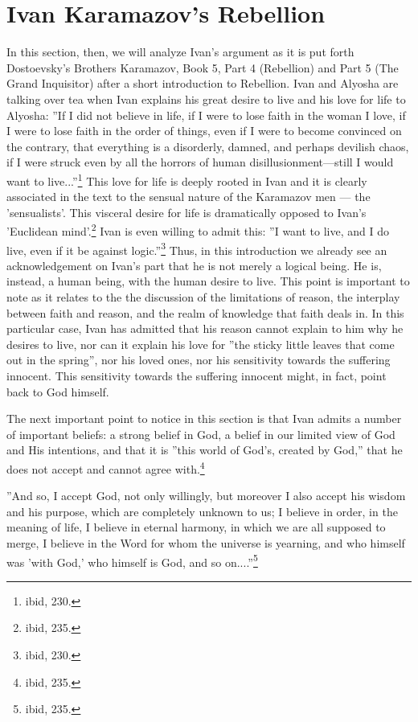 	\section{Ivan Karamazov's Rebellion}
In this section, then, we will analyze Ivan's argument as it is put forth Dostoevsky's Brothers Karamazov, Book 5, Part 4 (Rebellion) and Part 5 (The Grand Inquisitor) after a short introduction to Rebellion. Ivan and Alyosha are talking over tea when Ivan explains his great desire to live and his love for life to Alyosha: 
''If I did not believe in life, if I were to lose faith in the woman I love, if I were to lose faith in the order of things, even if I were to become convinced on the contrary, that everything is a disorderly, damned, and perhaps devilish chaos, if I were struck even by all the horrors of human disillusionment---still I would want to live...''\footnote{ibid, 230.} 
This love for life is deeply rooted in Ivan and it is clearly associated in the text to the sensual nature of the Karamazov men --- the 'sensualists'. This visceral desire for life is dramatically opposed to Ivan's 'Euclidean mind'.\footnote{ibid, 235.} Ivan is even willing to admit this: ''I want to live, and I do live, even if it be against logic.''\footnote{ibid, 230.} Thus, in this introduction we already see an acknowledgement on Ivan's part that he is not merely a logical being. He is, instead, a human being, with the human desire to live. This point is important to note as it relates to the the discussion of the limitations of reason, the interplay between faith and reason, and the realm of knowledge that faith deals in. In this particular case, Ivan has admitted that his reason cannot explain to him why he desires to live, nor can it explain his love for ''the sticky little leaves that come out in the spring'', nor his loved ones, nor his sensitivity towards the suffering innocent. This sensitivity towards the suffering innocent might, in fact, point back to God himself.

The next important point to notice in this section is that Ivan admits a number of important beliefs: a strong belief in God, a belief in our limited view of God and His intentions, and that it is ''this world of God's, created by God,'' that he does not accept and cannot agree with.\footnote{ibid, 235.}
 
''And so, I accept God, not only willingly, but moreover I also accept his wisdom and his purpose, which are completely unknown to us; I believe in order, in the meaning of life, I believe in eternal harmony, in which we are all supposed to merge, I believe in the Word for whom the universe is yearning, and who himself was 'with God,' who himself is God, and so on....''\footnote{ibid, 235.} 


